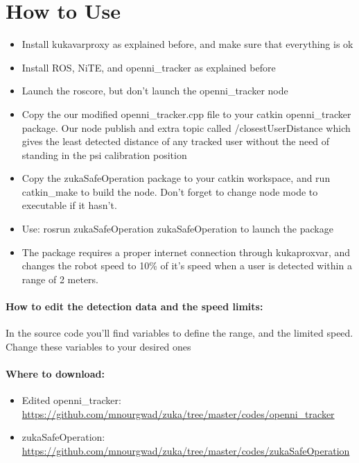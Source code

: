\section{How to Use}
\begin{itemize}
\item Install kukavarproxy as explained before, and make sure that everything is ok
\item Install ROS, NiTE, and openni\_tracker as explained before
\item Launch the roscore, but don’t launch the openni\_tracker node
\item Copy the our modified openni\_tracker.cpp file to your catkin openni\_tracker package. Our node publish and extra topic called /closestUserDistance which gives the least detected distance of any tracked user without the need of standing in the psi calibration position
\item Copy the zukaSafeOperation package to your catkin workspace, and run catkin\_make to build the node. Don’t forget to change node mode to executable if it hasn’t.
\item Use: rosrun zukaSafeOperation zukaSafeOperation to launch the package
\item The package requires a proper internet connection through kukaproxvar, and changes the robot speed to 10\% of it’s speed when a user is detected within a range of 2 meters.
\end{itemize}

\paragraph{How to edit the detection data and the speed limits:}
In the source code you’ll find variables to define the range, and the limited speed. Change these variables to your desired ones

\paragraph{Where to download: }
\begin{itemize}
\item Edited openni\_tracker:  \url{https://github.com/mnourgwad/zuka/tree/master/codes/openni_tracker}
\item zukaSafeOperation:  \url{https://github.com/mnourgwad/zuka/tree/master/codes/zukaSafeOperation} 
\end{itemize}